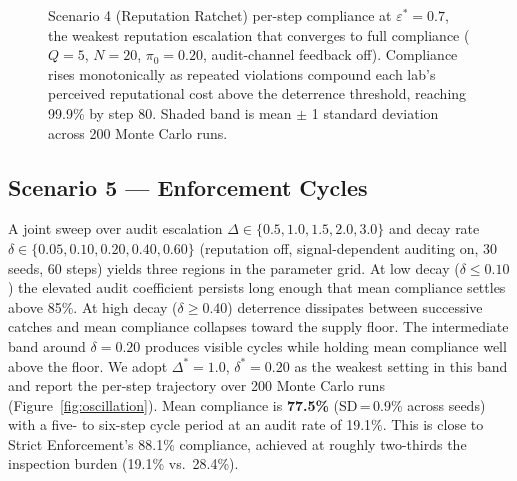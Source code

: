 \begin{figure}[htbp]
\centering
{}
\caption{Scenario 4 (Reputation Ratchet) per-step compliance at
  $\varepsilon^* = 0.7$, the weakest reputation escalation that
  converges to full compliance ($Q=5$, $N=20$, $\pi_0 = 0.20$,
  audit-channel feedback off). Compliance rises monotonically as
  repeated violations compound each lab's perceived reputational
  cost above the deterrence threshold, reaching 99.9\% by step 80.
  Shaded band is mean $\pm$ 1 standard deviation across 200 Monte
  Carlo runs.}
\label{fig:ratchet}
\end{figure}

\subsection{Scenario 5 --- Enforcement Cycles}

A joint sweep over audit escalation $\Delta \in \{0.5, 1.0, 1.5,
2.0, 3.0\}$ and decay rate $\delta \in \{0.05, 0.10, 0.20, 0.40,
0.60\}$ (reputation off, signal-dependent auditing on, 30 seeds, 60
steps) yields three regions in the parameter grid. At low decay
($\delta \leq 0.10$) the elevated audit coefficient persists long
enough that mean compliance settles above 85\%. At high decay
($\delta \geq 0.40$) deterrence dissipates between successive catches
and mean compliance collapses toward the supply floor. The
intermediate band around $\delta = 0.20$ produces visible cycles
while holding mean compliance well above the floor. We adopt
$\Delta^* = 1.0$, $\delta^* = 0.20$ as the weakest setting in this
band and report the per-step trajectory over 200 Monte Carlo runs
(Figure~\ref{fig:oscillation}). Mean compliance is \textbf{77.5\%}
(SD\,=\,0.9\% across seeds) with a five- to six-step cycle period at
an audit rate of 19.1\%. This is close to Strict Enforcement's
88.1\% compliance, achieved at roughly two-thirds the inspection
burden (19.1\% vs.\ 28.4\%).

